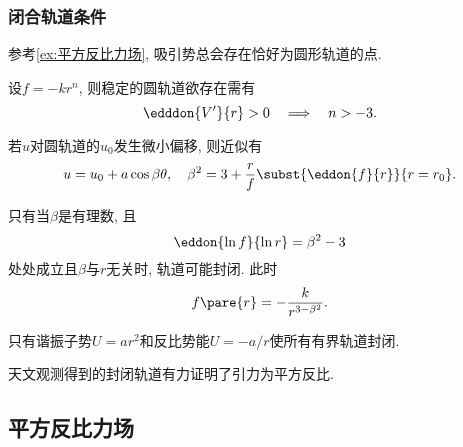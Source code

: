 \documentclass[../TheoreticalMechanics.tex]{subfiles}
\begin{document}

\subsubsection{闭合轨道条件} %
\label{ssub:闭合轨道条件}

\begin{remark}
	参考\cref{ex:平方反比力场}, 吸引势总会存在恰好为圆形轨道的点.
\end{remark}
\begin{lemma}[稳定圆轨道的条件]
	设$f = -kr^n$, 则稳定的圆轨道欲存在需有
	\[ \edddon{V'}{r} > 0\quad\Longrightarrow\quad n>-3. \]
\end{lemma}
\begin{theorem}[圆轨道的小偏移]
	若$u$对圆轨道的$u_0$发生微小偏移, 则近似有
	\[ u = u_0 + a\cos\beta\theta,\quad \beta^2 = 3+\frac{r}{f}\subst{\eddon{f}{r}}{r=r_0}. \]
\end{theorem}
\begin{theorem}[封闭轨道条件]
	只有当$\beta$是有理数, 且
	\[ \eddon{\ln f}{\ln r} = \beta^2 - 3 \]
	处处成立且$\beta$与$r$无关时, 轨道可能封闭. 此时
	\[ f\pare{r} = -\frac{k}{r^{3-\beta^2}}. \]
\end{theorem}
\begin{theorem}[Betrand定理]
	只有谐振子势$U=ar^2$和反比势能$U=-a/r$使所有有界轨道封闭.
\end{theorem}
\begin{remark}
	天文观测得到的封闭轨道有力证明了引力为平方反比.
\end{remark}



\subsection{平方反比力场} %
\label{sub:平方反比力场}
\end{document}
